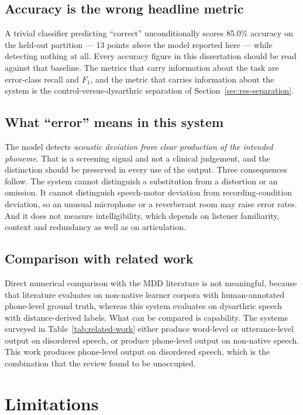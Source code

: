 \subsection{Accuracy is the wrong headline metric}

A trivial classifier predicting ``correct'' unconditionally scores 85.0\%
accuracy on the held-out partition --- 13 points \emph{above} the model reported
here --- while detecting nothing at all. Every accuracy figure in this
dissertation should be read against that baseline. The metrics that carry
information about the task are error-class recall and $F_1$, and the metric that
carries information about the system is the control-versus-dysarthric
separation of Section~\ref{sec:res-separation}.

\subsection{What ``error'' means in this system}

The model detects \emph{acoustic deviation from clear production of the intended
phoneme}. That is a screening signal and not a clinical judgement, and the
distinction should be preserved in every use of the output. Three consequences
follow. The system cannot distinguish a substitution from a distortion or an
omission. It cannot distinguish speech-motor deviation from recording-condition
deviation, so an unusual microphone or a reverberant room may raise error rates.
And it does not measure intelligibility, which depends on listener familiarity,
context and redundancy as well as on articulation.

\subsection{Comparison with related work}

Direct numerical comparison with the MDD literature is not meaningful, because
that literature evaluates on non-native learner corpora with human-annotated
phone-level ground truth, whereas this system evaluates on dysarthric speech
with distance-derived labels. What can be compared is capability. The systems
surveyed in Table~\ref{tab:related-work} either produce word-level or
utterance-level output on disordered speech, or produce phone-level output on
non-native speech. This work produces phone-level output on disordered speech,
which is the combination that the review found to be unoccupied.

\section{Limitations}
\label{sec:limitations}

